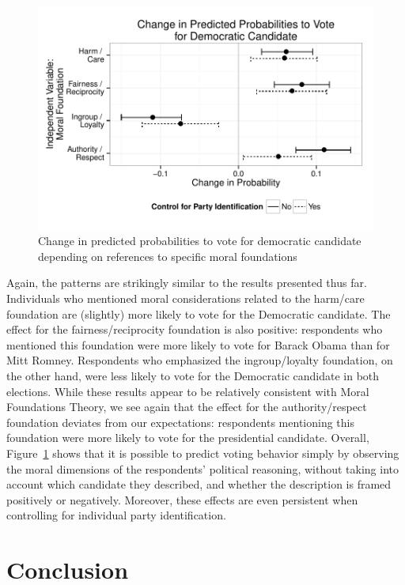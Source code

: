 \documentclass[12pt]{article}
\begin{document}
\begin{figure}[h]\centering
\includegraphics[scale=.9]{../calc/fig/fig8vote.pdf}
\caption{Change in predicted probabilities to vote for democratic candidate depending on references to specific moral foundations}\label{fig:8vote}
\end{figure}

Again, the patterns are strikingly similar to the results presented thus far. Individuals who mentioned moral considerations related to the harm/care foundation are (slightly) more likely to vote for the Democratic candidate. The effect for the fairness/reciprocity foundation is also positive: respondents who mentioned this foundation were more likely to vote for Barack Obama than for Mitt Romney. Respondents who emphasized the ingroup/loyalty foundation, on the other hand, were less likely to vote for the Democratic candidate in both elections. While these results appear to be relatively consistent with Moral Foundations Theory, we see again that the effect for the authority/respect foundation deviates from our expectations: respondents mentioning this foundation were more likely to vote for the presidential candidate. Overall, Figure~\ref{fig:8vote} shows that it is possible to predict voting behavior simply by observing the moral dimensions of the respondents' political reasoning, without taking into account which candidate they described, and whether the description is framed positively or negatively. Moreover, these effects are even persistent when controlling for individual party identification.


\section{Conclusion}
\end{document}
